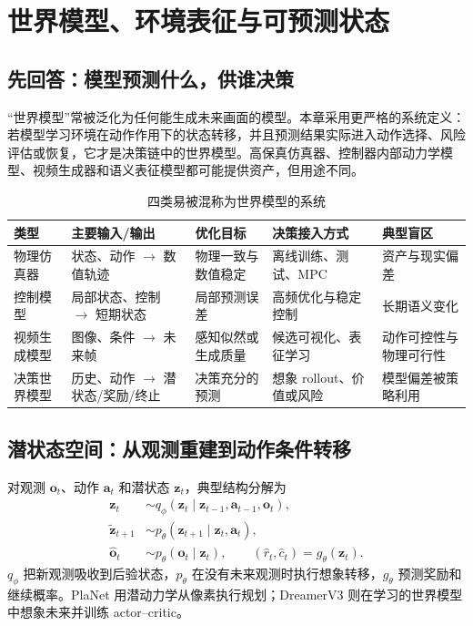 \chapter{世界模型、环境表征与可预测状态}
\label{chap:world-models}

\section{先回答：模型预测什么，供谁决策}

“世界模型”常被泛化为任何能生成未来画面的模型。本章采用更严格的系统定义：若模型学习环境在动作作用下的状态转移，并且预测结果实际进入动作选择、风险评估或恢复，它才是决策链中的世界模型。高保真仿真器、控制器内部动力学模型、视频生成器和语义表征模型都可能提供资产，但用途不同。

\begin{table}[H]
\centering
\caption{四类易被混称为世界模型的系统}
\label{tab:world-model-types}
\begin{tabularx}{\textwidth}{p{}YYYY}
\toprule
类型 & 主要输入/输出 & 优化目标 & 决策接入方式 & 典型盲区 \\
\midrule
物理仿真器 & 状态、动作 $\to$ 数值轨迹 & 物理一致与数值稳定 & 离线训练、测试、MPC & 资产与现实偏差 \\
控制模型 & 局部状态、控制 $\to$ 短期状态 & 局部预测误差 & 高频优化与稳定控制 & 长期语义变化 \\
视频生成模型 & 图像、条件 $\to$ 未来帧 & 感知似然或生成质量 & 候选可视化、表征学习 & 动作可控性与物理可行性 \\
决策世界模型 & 历史、动作 $\to$ 潜状态/奖励/终止 & 决策充分的预测 & 想象 rollout、价值或风险 & 模型偏差被策略利用 \\
\bottomrule
\end{tabularx}
\end{table}

\section{潜状态空间：从观测重建到动作条件转移}

对观测 $\bm{o}_t$、动作 $\bm{a}_t$ 和潜状态 $\bm{z}_t$，典型结构分解为
\begin{align}
\bm{z}_t &\sim q_\phi(\bm{z}_t\mid \bm{z}_{t-1},\bm{a}_{t-1},\bm{o}_t),\\
\tilde{\bm{z}}_{t+1} &\sim p_\theta(\bm{z}_{t+1}\mid \bm{z}_t,\bm{a}_t),\\
\hat{\bm{o}}_t &\sim p_\theta(\bm{o}_t\mid\bm{z}_t),\qquad
(\hat r_t,\hat c_t)=g_\theta(\bm{z}_t).
\label{eq:latent-world-model}
\end{align}
$q_\phi$ 把新观测吸收到后验状态，$p_\theta$ 在没有未来观测时执行想象转移，$g_\theta$ 预测奖励和继续概率。PlaNet 用潜动力学从像素执行规划\cite{hafner2019planet}；DreamerV3 则在学习的世界模型中想象未来并训练 actor--critic\cite{hafner2023dreamerv3}。

